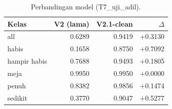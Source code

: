 \begin{table}[htbp]
\centering
\caption{Perbandingan model (T7_uji_adil).}
\label{tab:T7_uji_adil}
\begin{tabular}{lrrr}
\hline
Kelas & V2 (lama) & V2.1-clean & $\Delta$ \\
\hline
all & 0.6289 & 0.9419 & $+$0.3130 \\
habis & 0.1658 & 0.8750 & $+$0.7092 \\
hampir habis & 0.7688 & 0.9493 & $+$0.1805 \\
meja & 0.9950 & 0.9950 & $+$0.0000 \\
penuh & 0.8382 & 0.9856 & $+$0.1474 \\
sedikit & 0.3770 & 0.9047 & $+$0.5277 \\
\hline
\end{tabular}
\end{table}
